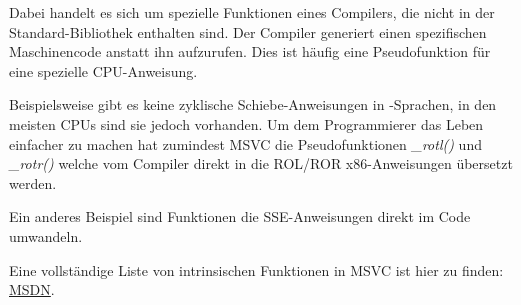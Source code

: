 \label{sec:compiler_intrinsic}


Dabei handelt es sich um spezielle Funktionen eines Compilers, die nicht in der
Standard-Bibliothek enthalten sind.
Der Compiler generiert einen spezifischen Maschinencode anstatt ihn aufzurufen.
Dies ist häufig eine Pseudofunktion für eine spezielle \ac{CPU}-Anweisung.

Beispielsweise gibt es keine zyklische Schiebe-Anweisungen in \CCpp -Sprachen,
in den meisten \ac{CPU}s sind sie jedoch vorhanden.
Um dem Programmierer das Leben einfacher zu machen hat zumindest MSVC die
Pseudofunktionen \emph{\_rotl()} und \emph{\_rotr()}\FNMSDNROTxURL{} welche vom
Compiler direkt in die ROL/ROR x86-Anweisungen übersetzt werden.

Ein anderes Beispiel sind Funktionen die SSE-Anweisungen direkt im Code umwandeln.

Eine vollständige Liste von intrinsischen Funktionen in MSVC ist hier zu finden:
\href{http://go.yurichev.com/17254}{MSDN}.
